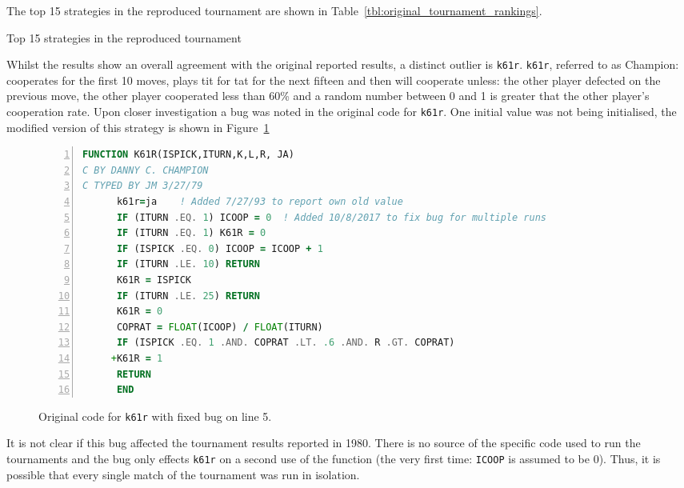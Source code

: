 \documentclass{article}
\begin{document}
The top 15 strategies in the reproduced tournament are shown in
Table~\ref{tbl:original_tournament_rankings}.

\begin{table}[!hbtp]
        \centering
        
        \caption{Top 15 strategies in the reproduced tournament}
        \label{tbl:original_tournament_rankings}
\end{table}

Whilst the results show an overall agreement with the original reported results,
a distinct outlier is \texttt{k61r}.
\texttt{k61r}, referred to as Champion: cooperates for the first 10
moves, plays tit for tat for the next fifteen and then will cooperate
unless: the other player defected on the previous move, the
other player cooperated less than 60\% and a random number between
0 and 1 is greater that the other player's cooperation rate.
Upon closer investigation a bug was noted in the original code for
\texttt{k61r}. One initial value was not being initialised, the modified version
of this strategy is shown in Figure~\ref{fig:k61r}

\begin{figure}[!hbtp]
    \begin{center}
        \begin{lstlisting}[language=Fortran,
                           basicstyle=\ttfamily,
                           frame=single,
                           keywordstyle=\color{red},
                           numbers=left,
                           commentstyle=\color{green}]
      FUNCTION K61R(ISPICK,ITURN,K,L,R, JA)
C BY DANNY C. CHAMPION
C TYPED BY JM 3/27/79
      k61r=ja    ! Added 7/27/93 to report own old value
      IF (ITURN .EQ. 1) ICOOP = 0  ! Added 10/8/2017 to fix bug for multiple runs
      IF (ITURN .EQ. 1) K61R = 0
      IF (ISPICK .EQ. 0) ICOOP = ICOOP + 1
      IF (ITURN .LE. 10) RETURN
      K61R = ISPICK
      IF (ITURN .LE. 25) RETURN
      K61R = 0
      COPRAT = FLOAT(ICOOP) / FLOAT(ITURN)
      IF (ISPICK .EQ. 1 .AND. COPRAT .LT. .6 .AND. R .GT. COPRAT)
     +K61R = 1
      RETURN
      END
        \end{lstlisting}
        \caption{Original code for \texttt{k61r} with fixed bug on line 5.}
        \label{fig:k61r}
    \end{center}
\end{figure}

It is not clear if this bug affected the tournament results reported in 1980.
There is no source of the specific code used to run the tournaments and
the bug only effects \texttt{k61r} on a second use of the function (the very
first time: \texttt{ICOOP} is assumed to be 0). Thus, it is possible that every
single match of the tournament was run in isolation.
\end{document}
